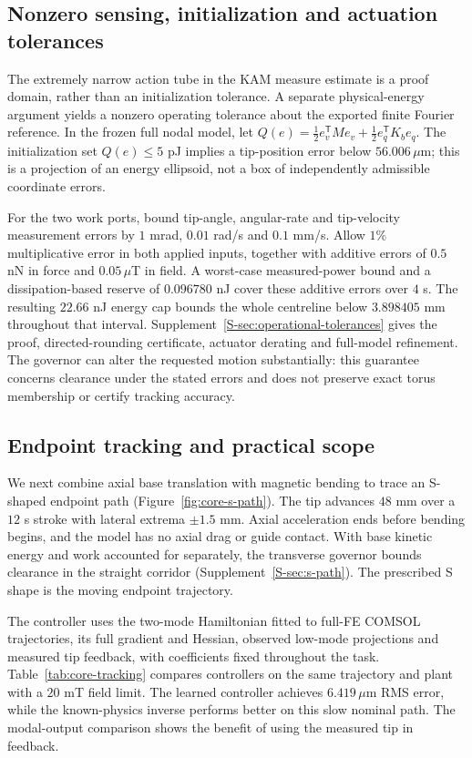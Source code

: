\subsection{Nonzero sensing, initialization and actuation tolerances}
The extremely narrow action tube in the KAM measure estimate is a proof domain, rather than an initialization tolerance. A separate physical-energy argument yields a nonzero operating tolerance about the exported finite Fourier reference. In the frozen full nodal model, let $Q(e)=\tfrac12 e_v^{\mathsf T}Me_v+\tfrac12 e_q^{\mathsf T}K_be_q$. The initialization set $Q(e)\leq5$ pJ implies a tip-position error below $56.006\,\mu$m; this is a projection of an energy ellipsoid, not a box of independently admissible coordinate errors.

For the two work ports, bound tip-angle, angular-rate and tip-velocity measurement errors by $1$ mrad, $0.01$ rad/s and $0.1$ mm/s. Allow $1\%$ multiplicative error in both applied inputs, together with additive errors of $0.5$ nN in force and $0.05\,\mu$T in field. A worst-case measured-power bound and a dissipation-based reserve of $0.096780$ nJ cover these additive errors over $4$ s. The resulting $22.66$ nJ energy cap bounds the whole centreline below $3.898405$ mm throughout that interval. Supplement~\ref{S-sec:operational-tolerances} gives the proof, directed-rounding certificate, actuator derating and full-model refinement. The governor can alter the requested motion substantially: this guarantee concerns clearance under the stated errors and does not preserve exact torus membership or certify tracking accuracy.

\subsection{Endpoint tracking and practical scope}
We next combine axial base translation with magnetic bending to trace an S-shaped endpoint path (Figure~\ref{fig:core-s-path}). The tip advances $48$ mm over a $12$ s stroke with lateral extrema $\pm1.5$ mm. Axial acceleration ends before bending begins, and the model has no axial drag or guide contact. With base kinetic energy and work accounted for separately, the transverse governor bounds clearance in the straight corridor (Supplement~\ref{S-sec:s-path}). The prescribed S shape is the moving endpoint trajectory.

The controller uses the two-mode Hamiltonian fitted to full-FE COMSOL trajectories, its full gradient and Hessian, observed low-mode projections and measured tip feedback, with coefficients fixed throughout the task. Table~\ref{tab:core-tracking} compares controllers on the same trajectory and plant with a $20$ mT field limit. The learned controller achieves $6.419\,\mu$m RMS error, while the known-physics inverse performs better on this slow nominal path. The modal-output comparison shows the benefit of using the measured tip in feedback.

